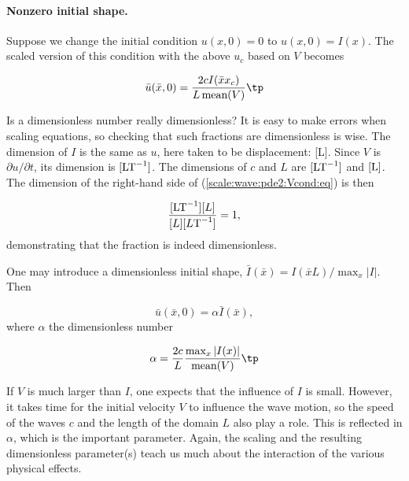 \documentclass[graybox,envcountchap,sectrefs,final]{svmonodo}
\newenvironment{notice_mdfboxadmon}[1][]{
\begin{notice_mdfboxmdframed}[frametitle=#1]
}
{
\end{notice_mdfboxmdframed}
}
\begin{document}
\paragraph{Nonzero initial shape.}
Suppose we change the initial condition $u(x,0)=0$ to $u(x,0)=I(x)$.
The scaled version of this condition with the above $u_c$
based on $V$ becomes

\begin{equation}
\bar u(\bar x, 0) = \frac{2cI(\bar x x_c)}{L\,\hbox{mean}(V)}\tp
\label{scale:wave:pde2:Vcond:eq}
\end{equation}


\begin{notice_mdfboxadmon}
Is a dimensionless number really dimensionless?
It is easy to make errors when scaling equations, so checking that
such fractions are dimensionless is wise.
The dimension of $I$ is the same as $u$, here taken to be displacement:
[L].
Since $V$ is $\partial u/\partial t$, its dimension is
$[\hbox{LT}^{-1}]$. The dimensions of $c$ and $L$ are
$[\hbox{LT}^{-1}]$ and $[\hbox{L}]$. The dimension of the right-hand side
of (\ref{scale:wave:pde2:Vcond:eq}) is then

\[ \frac{[\hbox{LT}^{-1}][L]}{[L][L\hbox{T}^{-1}]}
= 1,\]
demonstrating that the fraction is indeed dimensionless.
\end{notice_mdfboxadmon}



One may introduce a dimensionless initial
shape, $\bar I (\bar x)= I(\bar xL)/\max_x |I|$. Then

\[ \bar u(\bar x, 0) = \alpha\bar I(\bar x),\]
where $\alpha$ the dimensionless number

\[ \alpha = \frac{2c}{L}\frac{\max_x |I(x)|}{\hbox{mean}(V)}\tp\]


If $V$ is much larger than $I$, one expects that the influence of $I$
is small. However, it takes time for the initial velocity $V$ to
influence the wave motion, so the speed of the waves $c$ and the length
of the domain $L$ also play a role. This is reflected in $\alpha$, which is the
important parameter.
Again, the scaling and the resulting dimensionless parameter(s)
teach us much about the interaction of the various physical effects.

\end{document}
